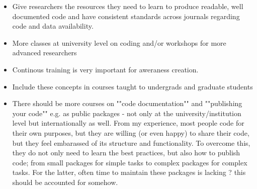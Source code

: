 \documentclass{article}
\begin{document}
\begin{itemize}
	\item Give researchers the resources they need to learn to produce readable, well documented code and have consistent standards across journals regarding code and data availability.
	\item More classes at university level on coding and/or workshops for more advanced researchers
	\item Continous training is very important for aweraness creation.
	\item Include these concepts in courses taught to undergrads and graduate students
	\item There should be more courses on ""code documentation"" and ""publishing your code"" e.g. as public packages - not only at the university/institution level but internationally as well. From my experience, most people code for their own purposes, but they are willing (or even happy) to share their code, but they feel embarassed of its structure and functionality. To overcome this, they do not only need to learn the best practices, but also how to publish code; from small packages for simple tasks to complex packages for complex tasks. For the latter, often time to maintain these packages is lacking ? this should be accounted for somehow.
\end{itemize}
\end{document}
